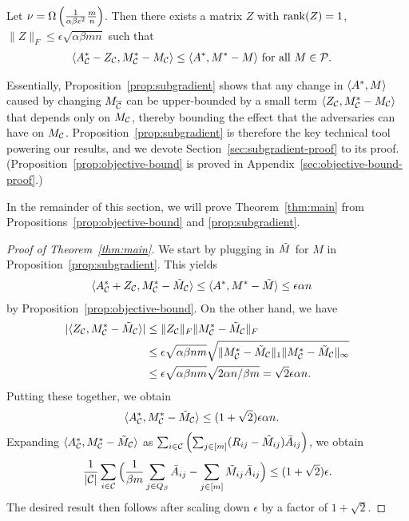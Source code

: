 \begin{proposition}
\label{prop:subgradient}
Let $\nu = \Omega\left( \frac{1}{\alpha\beta\epsilon^2}\frac{m}{n} \right)$. Then there exists a matrix $Z$ with 
$\operatorname{rank}(Z) = 1$, $\|Z\|_F \leq \epsilon \sqrt{\alpha\beta mn}$ such that
\begin{align}
\langle A^*_{\mathcal{C}} - Z_{\mathcal{C}}, M^*_{\mathcal{C}} - M_{\mathcal{C}} \rangle &\leq \langle A^*, M^* - M \rangle \text{ for all $M \in \mathcal{P}$}.
\end{align}
\end{proposition}
Essentially, Proposition~\ref{prop:subgradient} shows that any change in 
$\langle A^*, M \rangle$ caused by changing $M_{\overline{\mathcal{C}}}$ can be upper-bounded 
by a small term $\langle Z_{\mathcal{C}}, M^*_{\mathcal{C}} - M_{\mathcal{C}} \rangle$ that depends only 
on $M_{\mathcal{C}}$, thereby bounding the effect that the adversaries can have 
on $M_{\mathcal{C}}$. Proposition~\ref{prop:subgradient} is therefore the key 
technical tool powering our results, and we devote 
Section~\ref{sec:subgradient-proof} to its proof. (Proposition~\ref{prop:objective-bound} is proved in Appendix~\ref{sec:objective-bound-proof}.)

In the remainder of this section, we will prove Theorem~\ref{thm:main} from Propositions~\ref{prop:objective-bound} 
and \ref{prop:subgradient}.
\begin{proof}[Proof of Theorem~\ref{thm:main}]
We start by plugging in $\tilde{M}$ for $M$ in Proposition~\ref{prop:subgradient}. This yields
\begin{align}
\langle A^*_{\mathcal{C}} + Z_{\mathcal{C}}, M^*_{\mathcal{C}} - \tilde{M}_{\mathcal{C}} \rangle &\leq \langle A^*, M^* - \tilde{M} \rangle 
 \leq \epsilon \alpha n
\end{align}
by Proposition~\ref{prop:objective-bound}.
On the other hand, we have 
\begin{align}
|\langle Z_{\mathcal{C}}, M^*_{\mathcal{C}} - \tilde{M}_{\mathcal{C}} \rangle| &\leq \|Z_{\mathcal{C}}\|_F\|M^*_{\mathcal{C}} - \tilde{M}_{\mathcal{C}}\|_F \\
 &\leq \epsilon\sqrt{\alpha\beta nm} \sqrt{\|M^*_{\mathcal{C}} - \tilde{M}_{\mathcal{C}}\|_{1}\|M^*_{\mathcal{C}} - \tilde{M}_{\mathcal{C}}\|_{\infty}} \\
 &\leq \epsilon\sqrt{\alpha\beta nm} \sqrt{2\alpha n/\beta m} = \sqrt{2}\epsilon\alpha n.
\end{align}
Putting these together, we obtain
\begin{align}
\langle A^*_{\mathcal{C}}, M^*_{\mathcal{C}} - \tilde{M}_{\mathcal{C}} \rangle &\leq (1+\sqrt{2})\epsilon \alpha n.
\end{align}
Expanding $\langle A^*_{\mathcal{C}}, M^*_{\mathcal{C}} - \tilde{M}_{\mathcal{C}} \rangle$ as 
$\sum_{i \in \mathcal{C}}\left( \sum_{j \in [m]} (R_{ij} - \tilde{M}_{ij})\bar{A}_{ij} \right)$,
we obtain 
\[ \frac{1}{|\mathcal{C}|}\sum_{i \in \mathcal{C}}\Big(\frac{1}{\beta m}\sum_{j \in Q_{\beta}} \bar{A}_{ij} - \sum_{j \in [m]} \tilde{M}_{ij}\bar{A}_{ij}\Big) \leq (1+\sqrt{2})\epsilon. \]
The desired result then follows after scaling down $\epsilon$ 
by a factor of $1+\sqrt{2}$.
\end{proof}

